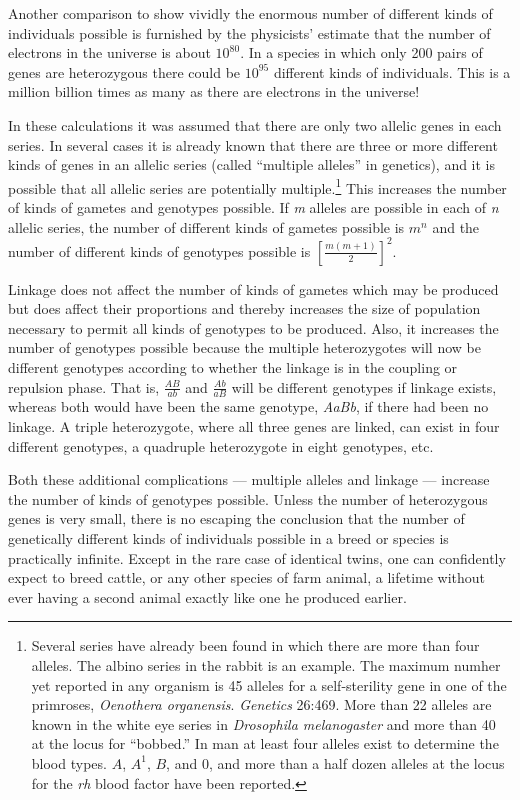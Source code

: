 Another comparison to show vividly the enormous number of different
kinds of individuals possible is furnished by the physicists' estimate
that the number of electrons in the universe is about $10^{80}$. In a
species in which only 200 pairs of genes are heterozygous there could be
$10^{95}$ different kinds of individuals. This is a million billion times as
many as there are electrons in the universe!

In these calculations it was assumed that there are only two allelic
genes in each series. In several cases it is already known that there are
three or more different kinds of genes in an allelic series (called ``multiple
alleles'' in genetics), and it is possible that all allelic series are potentially
multiple.\footnote{Several series have already been found in which there are more than four
alleles. The albino series in the rabbit is an example. The maximum numher yet
reported in any organism is 45 alleles for a self-sterility gene in one of the primroses,
\textit{Oenothera organensis}. \textit{Genetics} 26:469. More than 22 alleles are known in the white
eye series in \textit{Drosophila melanogaster} and more than 40 at the locus for ``bobbed.''
In man at least four alleles exist to determine the blood types. $A$, $A^1$, $B$, and $0$, and
more than a half dozen alleles at the locus for the \textit{rh} blood factor have been reported.}
This increases the number of kinds of gametes and
genotypes possible. If \textit{m} alleles are possible in each of \textit{n} allelic series,
the number of different kinds of gametes possible is $m^n$ and the number
of different kinds of genotypes possible is $ \left[ \frac{m(m+1)}{2} \right]^2 $.

Linkage does not affect the number of kinds of gametes which may
be produced but does affect their proportions and thereby increases the
size of population necessary to permit all kinds of genotypes to be produced.
Also, it increases the number of genotypes possible because the
multiple heterozygotes will now be different genotypes according to
whether the linkage is in the coupling or repulsion phase. That is, $\frac{AB}{ab}$
and $\frac{Ab}{aB}$ will be different genotypes if linkage exists, whereas both
would have been the same genotype, \textit{AaBb}, if there had been no linkage.
A triple heterozygote, where all three genes are linked, can exist
in four different genotypes, a quadruple heterozygote in eight genotypes,
etc.

Both these additional complications --- multiple alleles and linkage --- increase
the number of kinds of genotypes possible. Unless the number
of heterozygous genes is very small, there is no escaping the conclusion
that the number of genetically different kinds of individuals possible in
a breed or species is practically infinite. Except in the rare case of identical
twins, one can confidently expect to breed cattle, or any other
species of farm animal, a lifetime without ever having a second animal
exactly like one he produced earlier.

